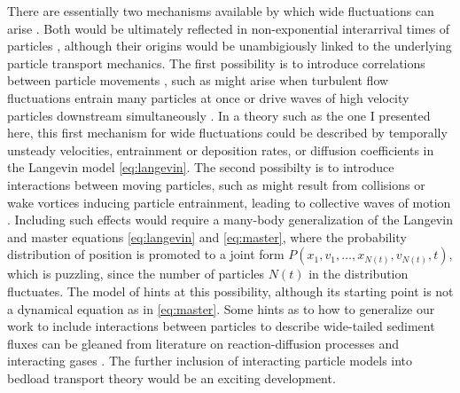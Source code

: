 There are essentially two mechanisms available by which wide fluctuations can arise \citep{Goh2008}. Both would be ultimately reflected in non-exponential interarrival times of particles \citep[e.g.][]{Turowski2010,Heyman2013}, although their origins would be unambigiously linked to the underlying particle transport mechanics.
The first possibility is to introduce correlations between particle movements \citep{Ancey2008,Heyman2013,Ancey2014}, such as might arise when turbulent flow fluctuations entrain many particles at once \citep{Cameron2020} or drive waves of high velocity particles downstream simultaneously \citep{Nino1996}. 
In a theory such as the one I presented here, this first mechanism for wide fluctuations could be described by temporally unsteady velocities, entrainment or deposition rates, or diffusion coefficients in the Langevin model \ref{eq:langevin}.
The second possibilty is to introduce interactions between moving particles, such as might result from collisions \citep{Lee2018} or wake vortices \citep{Schmeeckle2014} inducing particle entrainment, leading to collective waves of motion \citep{Ancey2014}.
Including such effects would require a many-body generalization of the Langevin and master equations \ref{eq:langevin} and \ref{eq:master}, where the probability distribution of position is promoted to a joint form $P(x_1,v_1,\dots,x_{N(t)},v_{N(t)},t)$, which is puzzling, since the number of particles $N(t)$ in the distribution fluctuates.
The model of \citet{Ancey2014} hints at this possibility, although its starting point is not a dynamical equation as in \ref{eq:master}.
Some hints as to how to generalize our work to include interactions between particles to describe wide-tailed sediment fluxes can be gleaned from literature on reaction-diffusion processes \citep{Hernandez2004,Cardy2006} and interacting gases \citep{Chapman1970,Brilliantov2004}. The further inclusion of interacting particle models into bedload transport theory would be an exciting development.

